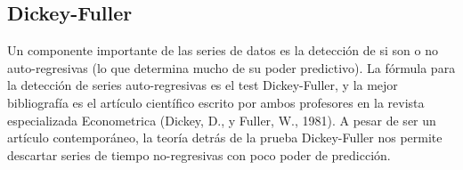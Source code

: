\subsection*{Dickey-Fuller} 
Un componente importante de las series de datos es la detección de si son o no auto-regresivas (lo que determina mucho de su poder predictivo). La fórmula para la detección de series auto-regresivas es el test Dickey-Fuller, y la mejor bibliografía es el artículo científico escrito por ambos profesores en la revista especializada Econometrica (Dickey, D., y Fuller, W., 1981). A pesar de ser un artículo contemporáneo, la teoría detrás de la prueba Dickey-Fuller nos permite descartar series de tiempo no-regresivas con poco poder de predicción. 
